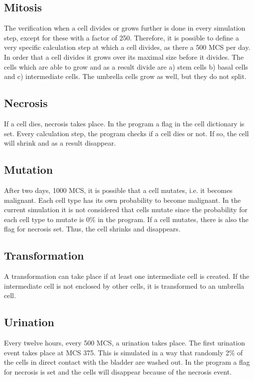 \subsection{Mitosis}
The verification when a cell divides or grows further is done in every simulation step, except for these with a factor of 250. Therefore, it is possible to define a very specific calculation step at which a cell divides, as there a 500 \ac{MCS} per day. In order that a cell divides it grows over its maximal size before it divides.
The cells which are able to grow and as a result divide are a) stem cells b) basal cells and c) intermediate cells. The umbrella cells grow as well, but they do not split.

\subsection{Necrosis}
If a cell dies, necrosis takes place. In the program a flag in the cell dictionary is set. Every calculation step, the program checks if a cell dies or not. If so, the cell will shrink and as a result disappear.

\subsection{Mutation}
After two days, 1000 \ac{MCS}, it is possible that a cell mutates, i.e. it becomes malignant. Each cell type has its own probability to become malignant. In the current simulation it is not considered that cells mutate since the probability for each cell type to mutate is 0\% in the program. \newline
If a cell mutates, there is also the flag for necrosis set. Thus, the cell shrinks and disappears.

\subsection{Transformation}
A transformation can take place if at least one intermediate cell is created. If the intermediate cell is not enclosed by other cells, it is transformed to an umbrella cell.

\subsection{Urination}
Every twelve hours, every 500 \ac{MCS}, a urination takes place. The first urination event takes place at \ac{MCS} 375. This is simulated in a way that randomly 2\% of the cells in direct contact with the bladder are washed out. In the program a flag for necrosis is set and the cells will disappear because of the necrosis event.



